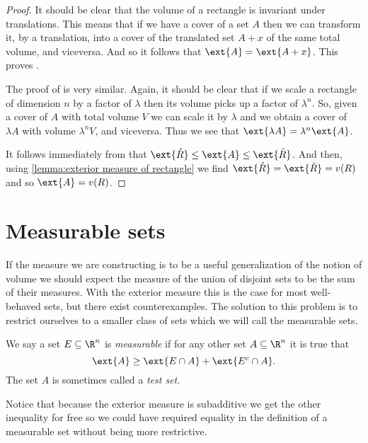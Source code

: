 \documentclass[12pt,oneside]{book}
\begin{document}
{\begin{proof}
		It should be clear that the volume of a rectangle is invariant under translations. This means that if we have a cover of a set \( A \) then we can transform it, by a translation, into a cover of the translated set \( A + x \) of the same total volume, and viceversa. And so it follows that \( \ext{A} = \ext{A + x} \). This proves .

		The proof of  is very similar. Again, it should be clear that if we scale a rectangle of dimension \( n \) by a factor of \( \lambda \) then its volume picks up a factor of \( \lambda^n \). So, given a cover of \( A \) with total volume \( V \) we can scale it by \( \lambda \) and we obtain a cover of \( \lambda A \) with volume \( \lambda^n V \), and viceversa. Thus we see that \( \ext{\lambda A} = \lambda^n \ext{A} \).

		It follows immediately from  that \( \ext{\mathring{R}} \leq \ext{A} \leq
		\ext{\bar{R}} \). And then, using \cref{lemma:exterior measure of rectangle} we find
		\( \ext{\mathring{R}} = \ext{\bar{R}} = v(R) \) and so \( \ext{A} = v(R) \). 
	\end{proof}
}

\section{Measurable sets}
If the measure we are constructing is to be a useful generalization of the notion of volume we should expect the measure of the union of disjoint sets to be the sum of their measures. With the exterior measure this is the case for most well-behaved sets, but there exist counterexamples. The solution to this problem is to restrict ourselves to a smaller class of sets which we will call the measurable sets.
\begin{definition}\label{def:measurable set}
	We say a set \( E \subseteq \R^n \) is \emph{measurable} if for any other set \( A \subseteq \R^n \) it is true that
	\begin{equation*}
		\ext{A} \geq \ext{E \cap A} + \ext{E^c \cap A}.
	\end{equation*}
The set \( A \) is sometimes called a \emph{test set}.
\end{definition}

Notice that because the exterior measure is subadditive we get the other inequality for free so we could have required equality in the definition of a measurable set without being more restrictive.
\end{document}
